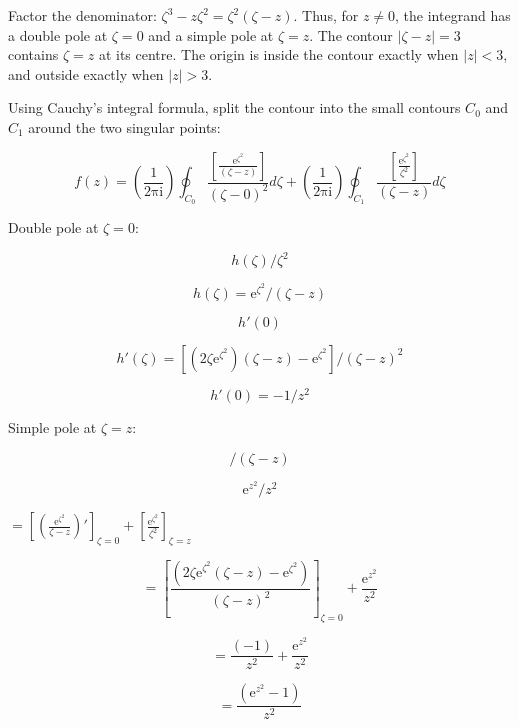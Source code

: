 \documentclass[11pt,a4paper]{article}
\theoremstyle{definition}
\theoremstyle{plain}
\begin{document}
Factor the denominator: $\zeta^{3} - z\zeta^{2} = \zeta^{2}(\zeta - z)$. Thus, for $z \ne 0$, the integrand has a double pole at $\zeta = 0$ and a simple pole at $\zeta = z$. The contour $\vert{}\zeta - z\vert{} = 3$ contains $\zeta = z$ at its centre. The origin is inside the contour exactly when $\vert{}z\vert{} < 3$, and outside exactly when $\vert{}z\vert{} > 3$.

Using Cauchy's integral formula, split the contour into the small contours $C_{0}$ and $C_{1}$ around the two singular points:

\begin{equation}
f(z) = \left(\frac{1}{2\mathrm{\pi}\mathrm{i}}\right)\oint_{C_{0}}\frac{[\frac{\mathrm{e}^{\zeta^{2}}}{(\zeta - z)}]}{(\zeta - 0)^{2}}d\zeta + \left(\frac{1}{2\mathrm{\pi}\mathrm{i}}\right)\oint_{C_{1}}\frac{[\frac{\mathrm{e}^{\zeta^{2}}}{\zeta^{2}}]}{(\zeta - z)}d\zeta
\end{equation}

Double pole at $\zeta = 0$:

\begin{equation}
h(\zeta)/\zeta^{2}
\end{equation}

\[
h(\zeta) = \mathrm{e}^{\zeta^{2}}/(\zeta - z)
\]

\[
h'(0)
\]

\[
h'(\zeta) = [(2\zeta \mathrm{e}^{\zeta^{2}})(\zeta - z) - \mathrm{e}^{\zeta^{2}}]/(\zeta - z)^{2}
\]

\[
h'(0) = -1/z^{2}
\]

Simple pole at $\zeta = z$:

\begin{equation}
[\mathrm{e}^{\zeta^{2}}/\zeta^{2}]/(\zeta - z)
\end{equation}

\[
\mathrm{e}^{z^{2}}/z^{2}
\]

$=$${\left[\left(\frac{\mathrm{e}^{\zeta^{2}}}{\zeta - z}\right)'\right]}_{\zeta = 0} + {\left[\frac{\mathrm{e}^{\zeta^{2}}}{\zeta^{2}}\right]}_{\zeta = z}$

\begin{equation}
= {[\frac{({2\zeta \mathrm{e}}^{\zeta^{2}}(\zeta - z) - \mathrm{e}^{\zeta^{2}})}{(\zeta - z)^{2}}]}_{\zeta = 0} + \frac{\mathrm{e}^{z^{2}}}{z^{2}}
\end{equation}

\[
= \frac{(-1)}{z^{2}} + \frac{\mathrm{e}^{z^{2}}}{z^{2}}
\]

\[
= \frac{(\mathrm{e}^{z^{2}} - 1)}{z^{2}}
\]
\end{document}
